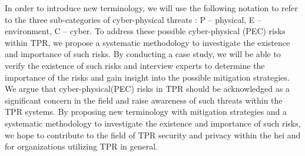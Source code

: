 In order to introduce new terminology, we will use the following notation to refer to the three sub-categories of cyber-physical threats
: P -- physical, E -- environment, C -- cyber. To address these possible cyber-physical (PEC) risks within \ac{TPR}, we
propose a systematic methodology to investigate the existence and importance of such risks. By conducting a case study, we will be able to
verify the existence of such risks and interview experts to determine the importance of the risks and gain insight into the possible
mitigation strategies. We argue that cyber-physical(PEC) risks in \ac{TPR} should be acknowledged as a significant concern in
the field and raise awareness of such threats within the \ac{TPR} systems. By proposing new terminology with
mitigation strategies and a systematic methodology to investigate the existence and importance of such risks, we hope to contribute to the
field of \ac{TPR} security and privacy within the \ac{hei} and for organizations utilizing \ac{TPR} in general.
